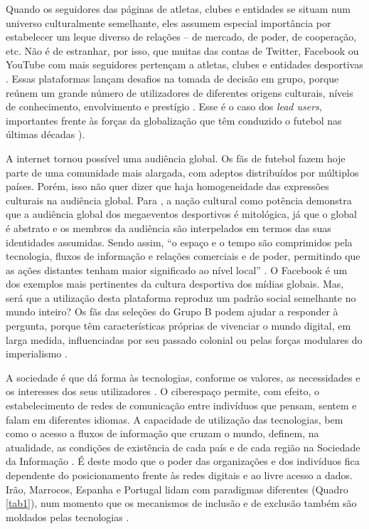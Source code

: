 \documentclass{textolivre}
\begin{document}
Quando os seguidores das páginas de atletas, clubes e entidades se situam num universo culturalmente semelhante, eles assumem especial importância por estabelecer um leque diverso de relações – de mercado, de poder, de cooperação, etc. Não é de estranhar, por isso, que muitas das contas de Twitter, Facebook ou YouTube com mais seguidores pertençam a atletas, clubes e entidades desportivas \cite{clavio2010}. Essas plataformas lançam desafios na tomada de decisão em grupo, porque reúnem um grande número de utilizadores de diferentes origens culturais, níveis de conhecimento, envolvimento e prestígio \cite{leen2018}. Esse é o caso dos \emph{lead users}, importantes frente às forças da globalização que têm conduzido o futebol nas últimas décadas \cite{hambrick2012, raaij1997}).

A internet tornou possível uma audiência global. Os fãs de futebol fazem hoje parte de uma comunidade mais alargada, com adeptos distribuídos por múltiplos países. Porém, isso não quer dizer que haja homogeneidade das expressões culturais na audiência global. Para \textcite{miller2001}, a nação cultural como potência demonstra que a audiência global dos megaeventos desportivos é mitológica, já que o global é abstrato e os membros da audiência são interpelados em termos das suas identidades assumidas. Sendo assim, “o espaço e o tempo são comprimidos pela tecnologia, fluxos de informação e relações comerciais e de poder, permitindo que as ações distantes tenham maior significado ao nível local” \cite[p. 131]{miller2001}. O Facebook é um dos exemplos mais pertinentes da cultura desportiva dos mídias globais. Mas, será que a utilização desta plataforma reproduz um padrão social semelhante no mundo inteiro? Os fãs das seleções do Grupo B podem ajudar a responder à pergunta, porque têm características próprias de vivenciar o mundo digital, em larga medida, influenciadas por seu passado colonial ou pelas forças modulares do imperialismo \cite{hobsbawm2003, kamrava2012}.

A sociedade é que dá forma às tecnologias, conforme os valores, as necessidades e os interesses dos seus utilizadores \cite{castells2009, castells2007}. O ciberespaço permite, com efeito, o estabelecimento de redes de comunicação entre indivíduos que pensam, sentem e falam em diferentes idiomas. A capacidade de utilização das tecnologias, bem como o acesso a fluxos de informação que cruzam o mundo, definem, na atualidade, as condições de existência de cada país e de cada região na Sociedade da Informação \cite{macedo2011}. É deste modo que o poder das organizações e dos indivíduos fica dependente do posicionamento frente às redes digitais e ao livre acesso a dados. Irão, Marrocos, Espanha e Portugal lidam com paradigmas diferentes (Quadro \ref{tab1}), num momento que os mecanismos de inclusão e de exclusão também são moldados pelas tecnologias \cite{lapa2019}.
\end{document}
